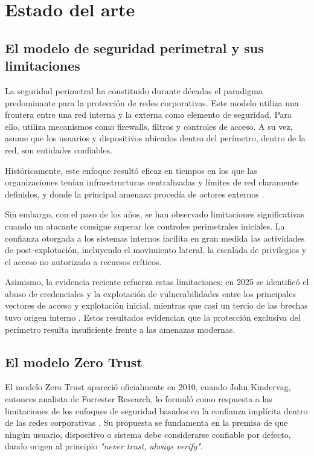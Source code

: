 \documentclass[11pt,spanish,listoffigures,listoftables]{tfgetsinf}
\begin{document}
\chapter{Estado del arte}
    \section{El modelo de seguridad perimetral y sus limitaciones}
    \label{sec:2.1}
    La seguridad perimetral ha constituido durante décadas el paradigma predominante para la protección de redes corporativas. Este modelo utiliza una frontera entre una red interna y la externa como elemento de seguridad. Para ello, utiliza mecanismos como firewalls, filtros y controles de acceso. A su vez, asume que los usuarios y dispositivos ubicados dentro del perímetro, dentro de la red, son entidades confiables. 
    
    Históricamente, este enfoque resultó eficaz en tiempos en los que las organizaciones tenían infraestructuras centralizadas y límites de red claramente definidos, y donde la principal amenaza procedía de actores externos \cite{perimetro}.
    
    Sin embargo, con el paso de los años, se han observado limitaciones significativas cuando un atacante consigue superar los controles perimetrales iniciales. La confianza otorgada a los sistemas internos facilita en gran medida las actividades de post-explotación, incluyendo el movimiento lateral, la escalada de privilegios y el acceso no autorizado a recursos críticos.
    
    Asimismo, la evidencia reciente refuerza estas limitaciones: en 2025 se identificó el abuso de credenciales y la explotación de vulnerabilidades entre los principales vectores de acceso y explotación inicial, mientras que casi un tercio de las brechas tuvo origen interno \cite{breaches2025}.  Estos resultados evidencian que la protección exclusiva del perímetro resulta insuficiente frente a las amenazas modernas.

    \section{El modelo Zero Trust}
    \label{sec:2.2}
    El modelo Zero Trust apareció oficialmente en 2010, cuando John Kindervag, entonces analista de Forrester Research, lo formuló como respuesta a las limitaciones de los enfoques de seguridad basados en la confianza implícita dentro de las redes corporativas \cite{kindervag2010}. Su propuesta se fundamenta en la premisa de que ningún usuario, dispositivo o sistema debe considerarse confiable por defecto, dando origen al principio \emph{"never trust, always verify"}.
     
\end{document}
